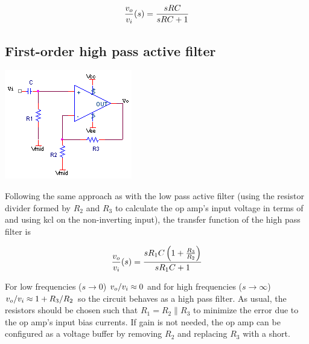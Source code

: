 \textcolor{red}{
\begin{equation}
\frac{\vout}{\vin}(s) = \frac{sRC}{sRC+1}
\label{eq:rcHPfilter}
\end{equation}
}

\subsection{First-order high pass active filter}
\begin{center}
	\includegraphics{schematics/1storderHPfilter.PNG}
\end{center}
Following the same approach as with the low pass active filter (using the resistor divider formed by $R_2$ and $R_3$ to calculate the op amp's input voltage in terms of \vout and using \ac{kcl} on the non-inverting input), the transfer function of the high pass filter is

\textcolor{red}{
\begin{equation}\frac{\vout}{\vin}(s) = \frac{sR_1 C \left(1 + \frac{R_3}{R_2}\right)}{sR_1 C + 1}
\label{eq:1storderHPfilter}
\end{equation}
}

For low frequencies ($s \to 0$) $\vout/\vin \approx 0$ and for high frequencies ($s \to \infty$) $\vout/\vin \approx 1 + R_3/R_2$ so the circuit behaves as a high pass filter.
As usual, the resistors should be chosen such that $R_1 = R_2 \parallel R_3$ to minimize the error due to the op amp's input bias currents.
If gain is not needed, the op amp can be configured as a voltage buffer by removing $R_2$ and replacing $R_3$ with a short.

